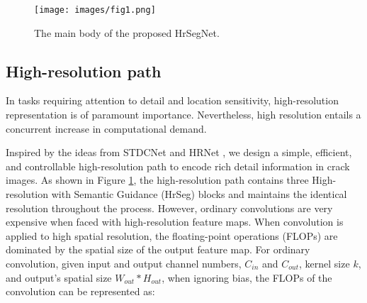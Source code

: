 \documentclass[preprint,12pt,authoryear]{elsarticle}
\begin{document}
\begin{figure}[t]
    \centering
    \texttt{[image: images/fig1.png]}
    \caption{The main body of the proposed HrSegNet.}
    \label{fig:fig1}
\end{figure}


\subsection{High-resolution path}
\label{subsec:Highresolutionpath}
In tasks requiring attention to detail and location sensitivity, high-resolution representation is of paramount importance. Nevertheless, high resolution entails a concurrent increase in computational demand.

Inspired by the ideas from STDCNet \citep{fan_rethinking_2021} and HRNet \citep{wang_deep_2020}, we design a simple, efficient, and controllable high-resolution path to encode rich detail information in crack images. As shown in Figure \ref{fig:fig1}, the high-resolution path contains three High-resolution with Semantic Guidance (HrSeg) blocks and maintains the identical resolution throughout the process. However, ordinary convolutions are very expensive when faced with high-resolution feature maps. When convolution is applied to high spatial resolution, the floating-point operations (FLOPs) are dominated by the spatial size of the output feature map. For ordinary convolution, given input and output channel numbers, $C_{in}$ and $C_{out}$, kernel size $k$, and output's spatial size $W_{out}*H_{out}$, when ignoring bias, the FLOPs of the convolution can be represented as:
\end{document}
